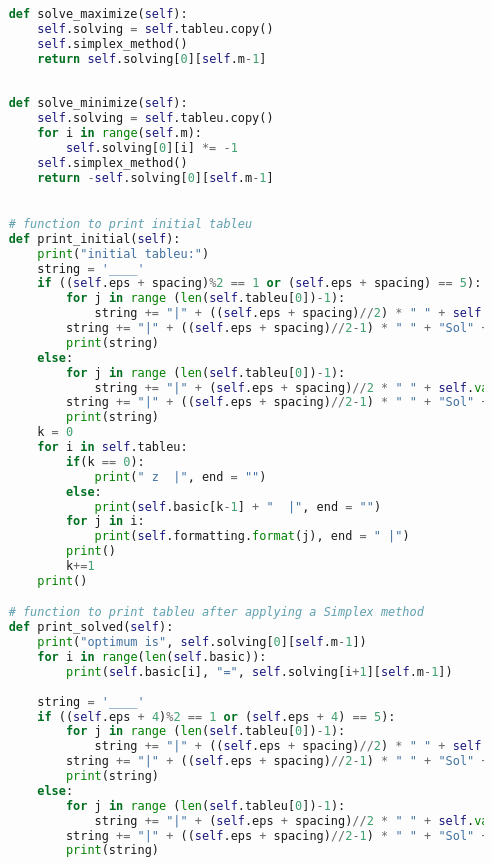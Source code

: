 \documentclass[12pt, legalpaper]{exam}
\begin{document}
\begin{lstlisting}[language=Python, caption=Программа на Python, label=lst:python-code]
    
    def solve_maximize(self):
        self.solving = self.tableu.copy()
        self.simplex_method()
        return self.solving[0][self.m-1]
        
    
    def solve_minimize(self): 
        self.solving = self.tableu.copy()
        for i in range(self.m):
            self.solving[0][i] *= -1
        self.simplex_method()
        return -self.solving[0][self.m-1]

    
    # function to print initial tableu
    def print_initial(self):
        print("initial tableu:")
        string = '____'
        if ((self.eps + spacing)%2 == 1 or (self.eps + spacing) == 5):
            for j in range (len(self.tableu[0])-1):
                string += "|" + ((self.eps + spacing)//2) * " " + self.vars[j] + ((self.eps + spacing)//2) * " "
            string += "|" + ((self.eps + spacing)//2-1) * " " + "Sol" + (self.eps + spacing)//2 * " " + "|"
            print(string)
        else: 
            for j in range (len(self.tableu[0])-1):
                string += "|" + (self.eps + spacing)//2 * " " + self.vars[j] + ((self.eps + spacing)//2-1) * " "
            string += "|" + ((self.eps + spacing)//2-1) * " " + "Sol" + ((self.eps + spacing)//2-1) * " " + "|"
            print(string)
        k = 0
        for i in self.tableu:
            if(k == 0):
                print(" z  |", end = "")
            else:
                print(self.basic[k-1] + "  |", end = "")
            for j in i:
                print(self.formatting.format(j), end = " |")
            print()
            k+=1
        print()

    # function to print tableu after applying a Simplex method
    def print_solved(self):
        print("optimum is", self.solving[0][self.m-1])
        for i in range(len(self.basic)):
            print(self.basic[i], "=", self.solving[i+1][self.m-1])
            
        string = '____'
        if ((self.eps + 4)%2 == 1 or (self.eps + 4) == 5):
            for j in range (len(self.tableu[0])-1):
                string += "|" + ((self.eps + spacing)//2) * " " + self.vars[j] + ((self.eps + spacing)//2) * " "
            string += "|" + ((self.eps + spacing)//2-1) * " " + "Sol" + (self.eps + spacing)//2 * " " + "|"
            print(string)
        else: 
            for j in range (len(self.tableu[0])-1):
                string += "|" + (self.eps + spacing)//2 * " " + self.vars[j] + ((self.eps + spacing)//2-1) * " "
            string += "|" + ((self.eps + spacing)//2-1) * " " + "Sol" + ((self.eps + spacing)//2-1) * " " + "|"
            print(string)


\end{lstlisting}
\end{document}
